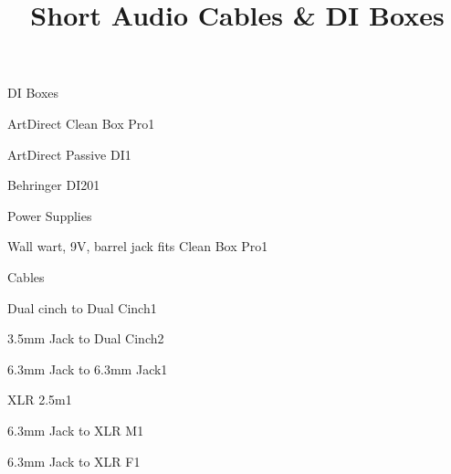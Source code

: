 \def\papersize{5}




\title{Short Audio Cables \& DI Boxes}

\begin{checklist}{DI Boxes}
  \item{ArtDirect Clean Box Pro}{1}
  \item{ArtDirect Passive DI}{1}
  \item{Behringer DI20}{1}
\end{checklist}

\begin{checklist}{Power Supplies}
  \item{Wall wart, 9V, barrel jack fits Clean Box Pro}{1}
\end{checklist}

\begin{checklist}{Cables}
  \item{Dual cinch to Dual Cinch}{1}
  \item{3.5mm Jack to Dual Cinch}{2}
  \item{6.3mm Jack to 6.3mm Jack}{1}
  \item{XLR 2.5m}{1}
  \item{6.3mm Jack to XLR M}{1}
  \item{6.3mm Jack to XLR F}{1}
\end{checklist}


